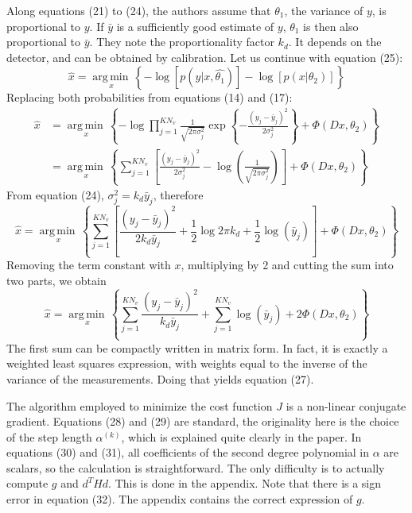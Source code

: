 \documentclass[a4paper, 10pt]{article}
\DeclareMathOperator*{\argmin}{arg\,min\,}
\begin{document}
Along equations (21) to (24), the authors assume that $\theta_1$, the variance of $y$, is proportional to $y$.
If $\bar{y}$ is a sufficiently good estimate of $y$, $\theta_1$ is then also proportional to $\bar{y}$. 
They note the proportionality factor $k_d$. It depends on the detector, and can be obtained by calibration.
Let us continue with equation (25):
\begin{equation*}
 \hat{x} = \argmin\limits_x \left\lbrace -\log \left[ p(y | x, \hat{\theta_1})\right] - \log \left[ p(x|\theta_2)\right] \right\rbrace
\end{equation*}
Replacing both probabilities from equations (14) and (17):
\begin{equation*}
 \begin{split}
 \hat{x} &= \argmin\limits_x \left\lbrace -\log \prod_{j=1}^{KN_v} \frac{1}{\sqrt{2\pi \sigma_j^2}} \exp \left\lbrace - \frac{(y_j - \bar{y}_j)^2}{2 \sigma_j^2} \right\rbrace + \Phi(Dx,\theta_2) \right\rbrace \\
 &= \argmin\limits_x \left\lbrace \sum_{j=1}^{KN_v} \left[ \frac{(y_j - \bar{y}_j)^2}{2 \sigma_j^2} - \log \left( \frac{1}{\sqrt{2\pi \sigma_j^2}} \right) \right] + \Phi(Dx,\theta_2) \right\rbrace
 \end{split}
\end{equation*}
From equation (24), $\sigma_j^2 = k_d \bar{y}_j$, therefore
\begin{equation*}
 \hat{x} = \argmin\limits_x \left\lbrace \sum_{j=1}^{KN_v} \left[ \frac{(y_j - \bar{y}_j)^2}{2 k_d \bar{y}_j} + \frac{1}{2} \log 2\pi k_d + \frac{1}{2} \log \left( \bar{y}_j \right) \right] + \Phi(Dx,\theta_2) \right\rbrace
\end{equation*}
Removing the term constant with $x$, multiplying by 2 and cutting the sum into two parts, we obtain
\begin{equation*}
 \hat{x} = \argmin\limits_x \left\lbrace \sum_{j=1}^{KN_v} \frac{(y_j - \bar{y}_j)^2}{k_d \bar{y}_j} + \sum_{j=1}^{KN_v} \log \left( \bar{y}_j \right) + 2 \Phi(Dx,\theta_2) \right\rbrace
\end{equation*}
The first sum can be compactly written in matrix form. In fact, it is exactly a weighted least squares expression, with weights equal to the inverse of the variance of the measurements. 
Doing that yields equation (27).

The algorithm employed to minimize the cost function $J$ is a non-linear conjugate gradient. Equations (28) and (29) are standard, 
the originality here is the choice of the step length $\alpha^{(k)}$, which is explained quite clearly in the paper. In equations (30) and (31), all coefficients of the second degree polynomial in
$\alpha$ are scalars, so the calculation is straightforward. The only difficulty is to actually compute $g$ and $d^THd$. This is done in the appendix.
Note that there is a sign error in equation (32). The appendix contains the correct expression of $g$.
\end{document}
